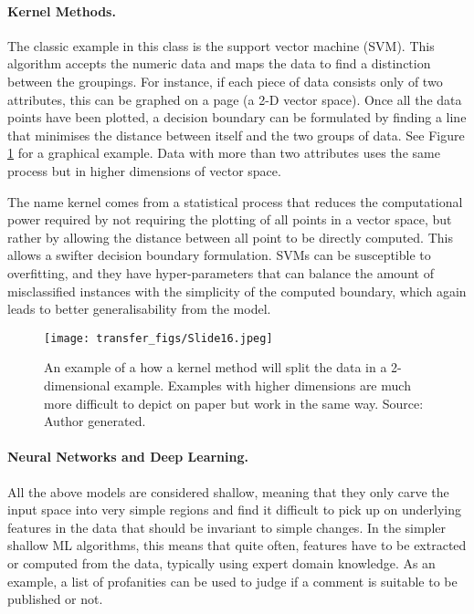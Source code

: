 \paragraph{Kernel Methods.} The classic example in this class is the support vector machine (SVM). This algorithm accepts the numeric data and maps the data to find a distinction between the groupings. For instance, if each piece of data consists only of two attributes, this can be graphed on a page (a 2-D vector space). Once all the data points have been plotted, a decision boundary can be formulated by finding a line that minimises the distance between itself and the two groups of data. See Figure \ref{fig:svm} for a graphical example. Data with more than two attributes uses the same process but in higher dimensions of vector space.

The name kernel comes from a statistical process that reduces the computational power required by not requiring the plotting of all points in a vector space, but rather by allowing the distance between all point to be directly computed. This allows a swifter decision boundary formulation. SVMs can be susceptible to overfitting, and they have hyper-parameters that can balance the amount of misclassified instances with the simplicity of the computed boundary, which again leads to better generalisability from the model. 


\begin{figure}
  \texttt{[image: transfer\_figs/Slide16.jpeg]}
  \caption[Kernel Methods Example.]{An example of a how a kernel method will split the data in a 2-dimensional example. Examples with higher dimensions are much more difficult to depict on paper but work in the same way.  Source: Author generated.}
  \label{fig:svm}
\end{figure}

\paragraph{Neural Networks and Deep Learning.} All the above models are considered shallow, meaning that they only carve the input space into very simple regions and find it difficult to pick up on underlying features in the data that should be invariant to simple changes. In the simpler shallow ML algorithms, this means that quite often, features have to be extracted or computed from the data, typically using expert domain knowledge.  As an example, a list of profanities can be used to judge if a comment is suitable to be published or not.

